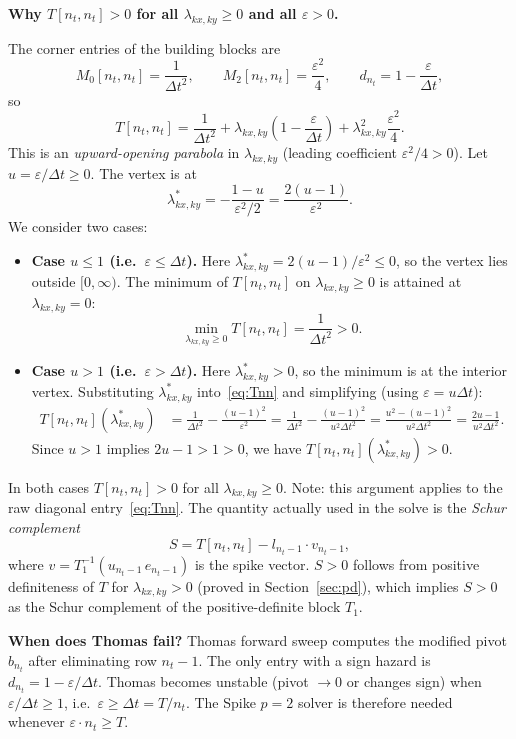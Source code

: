 \documentclass[11pt]{article}
\newcommand{\eps}{\varepsilon}
\newcommand{\dt}{\Delta t}
\newcommand{\lxy}{\lambda_{kx,ky}}
\begin{document}
\textbf{Why $T[n_t, n_t] > 0$ for all $\lxy \geq 0$ and all $\eps > 0$.}

The corner entries of the building blocks are
\[
  M_0[n_t,n_t] = \frac{1}{\dt^2}, \qquad M_2[n_t,n_t] = \frac{\eps^2}{4}, \qquad d_{n_t} = 1 - \frac{\eps}{\dt},
\]
so
\begin{equation} \label{eq:Tnn}
  T[n_t,n_t] = \frac{1}{\dt^2} + \lxy\!\left(1 - \frac{\eps}{\dt}\right) + \lxy^2 \frac{\eps^2}{4}.
\end{equation}
This is an \emph{upward-opening parabola} in $\lxy$ (leading coefficient $\eps^2/4 > 0$).
Let $u = \eps/\dt \geq 0$.  The vertex is at
\[
  \lxy^* = -\frac{1-u}{\eps^2/2} = \frac{2(u-1)}{\eps^2}.
\]
We consider two cases:

\begin{itemize}
  \item \textbf{Case $u \leq 1$ (i.e.\ $\eps \leq \dt$).}
        Here $\lxy^* = 2(u-1)/\eps^2 \leq 0$, so the vertex lies outside $[0,\infty)$.
        The minimum of $T[n_t,n_t]$ on $\lxy \geq 0$ is attained at $\lxy = 0$:
        \[
          \min_{\lxy \geq 0} T[n_t,n_t] = \frac{1}{\dt^2} > 0.
        \]

  \item \textbf{Case $u > 1$ (i.e.\ $\eps > \dt$).}
        Here $\lxy^* > 0$, so the minimum is at the interior vertex.
        Substituting $\lxy^*$ into~\eqref{eq:Tnn} and simplifying (using $\eps = u\dt$):
        \begin{align*}
          T[n_t,n_t](\lxy^*)
          &= \frac{1}{\dt^2} - \frac{(u-1)^2}{\eps^2}
           = \frac{1}{\dt^2} - \frac{(u-1)^2}{u^2\dt^2}
           = \frac{u^2 - (u-1)^2}{u^2\dt^2}
           = \frac{2u-1}{u^2\dt^2}.
        \end{align*}
        Since $u > 1$ implies $2u - 1 > 1 > 0$, we have $T[n_t,n_t](\lxy^*) > 0$.
\end{itemize}

In both cases $T[n_t,n_t] > 0$ for all $\lxy \geq 0$.
Note: this argument applies to the raw diagonal entry~\eqref{eq:Tnn}.
The quantity actually used in the solve is the \emph{Schur complement}
\[
  S = T[n_t,n_t] - l_{n_t-1} \cdot v_{n_t-1},
\]
where $v = T_1^{-1}(u_{n_t-1}\,e_{n_t-1})$ is the spike vector.
$S > 0$ follows from positive definiteness of $T$ for $\lxy > 0$
(proved in Section~\ref{sec:pd}), which implies
$S > 0$ as the Schur complement of the positive-definite block $T_1$.

\textbf{When does Thomas fail?}
Thomas forward sweep computes the modified pivot $b_{n_t}$ after eliminating row $n_t - 1$.
The only entry with a sign hazard is $d_{n_t} = 1 - \eps/\dt$.
Thomas becomes unstable (pivot $\to 0$ or changes sign) when $\eps/\dt \geq 1$,
i.e.\ $\eps \geq \dt = T/n_t$.
The Spike $p{=}2$ solver is therefore needed whenever $\eps \cdot n_t \geq T$.
\end{document}
